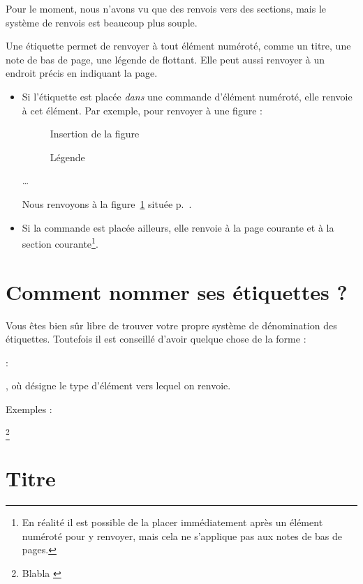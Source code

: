 Pour le moment, nous n'avons vu que des renvois vers des sections, mais le système de renvois est beaucoup plus souple.

Une étiquette permet de renvoyer à tout élément numéroté, comme un titre, une note de bas de page, une légende de flottant. Elle peut aussi renvoyer à un endroit précis en indiquant la page.

\begin{itemize}
\item Si l'étiquette  est placée \emph{dans}  une commande  d'élément numéroté, elle renvoie à cet élément. Par exemple, pour renvoyer à une figure :

\begin{latexcode}
\begin{figure}[paramètre de placement]
    Insertion de la figure
    \caption{Légende\label{figure}}
\end{figure} 
…

Nous renvoyons à la figure~\ref{figure} située p.~\pageref{figure}.
\end{latexcode}

\item Si la commande est placée ailleurs, elle renvoie à la page courante et à la section courante\footnote{En réalité il est possible de la placer immédiatement après un élément numéroté pour y renvoyer, mais cela ne s'applique pas aux notes de bas de pages.}.
\end{itemize}

\section{Comment nommer ses étiquettes ?}

Vous êtes bien sûr libre de trouver votre propre système de dénomination des étiquettes. Toutefois il est conseillé d'avoir quelque chose de la forme : \begin{english}:\end{english}, où  désigne le type d'élément vers lequel on renvoie.

Exemples :

\begin{english}
\begin{latexcode}
\footnote{Blabla \label{note:nom}}
\section{Titre \label{section:nom}}
\end{latexcode}
\end{english}


